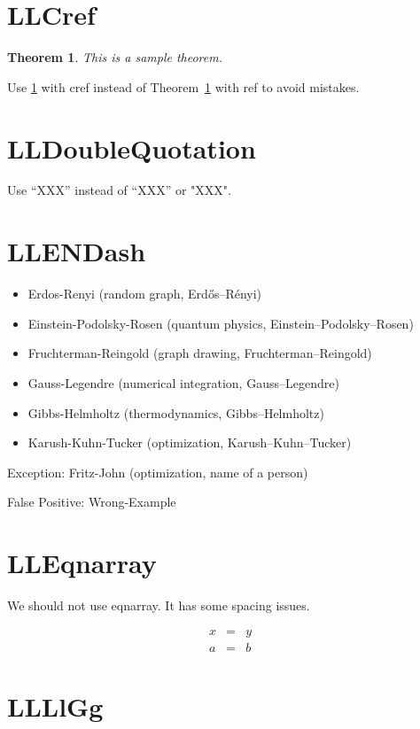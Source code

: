 \documentclass[a4paper, 10pt]{article}
\newtheorem{theorem}{Theorem}
\begin{document}
\section{LLCref}

\begin{theorem}
    \label{thm:sample}
    This is a sample theorem.
\end{theorem}

Use \cref{thm:sample} with cref instead of Theorem~\ref{thm:sample} with ref to avoid mistakes.

\section{LLDoubleQuotation}

Use ``XXX'' instead of “XXX” or "XXX".

\section{LLENDash}

\begin{itemize}
    \item Erdos-Renyi (random graph, Erd\H{o}s--R\'enyi)
    \item Einstein-Podolsky-Rosen (quantum physics, Einstein--Podolsky--Rosen)
    \item Fruchterman-Reingold (graph drawing, Fruchterman--Reingold)
    \item Gauss-Legendre (numerical integration, Gauss--Legendre)
    \item Gibbs-Helmholtz (thermodynamics, Gibbs--Helmholtz)
    \item Karush-Kuhn-Tucker (optimization, Karush--Kuhn--Tucker)
\end{itemize}

Exception: Fritz-John (optimization, name of a person)

False Positive: Wrong-Example

\section{LLEqnarray}

We should not use eqnarray. It has some spacing issues.

\begin{eqnarray}
    x & = & y \\
    a & = & b
\end{eqnarray}

\section{LLLlGg}
\end{document}
